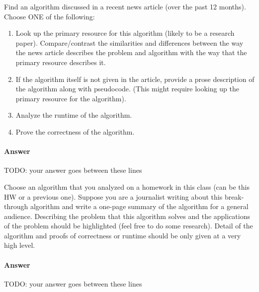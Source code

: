 \documentclass{article}
\begin{document}

\nextprob
{}

Find an algorithm discussed in a recent news article (over the past 12 months).
Choose ONE of the following:
\begin{enumerate}
    \item Look up the primary resource for this algorithm (likely to be a research paper).
    Compare/contrast the similarities and differences between the way the news article describes the problem and algorithm with the way that the primary resource describes it.
    \item If the algorithm itself is not given in the article, provide a prose description of the algorithm along with pseudocode.
    (This might require looking up the primary resource for the algorithm).
    \item Analyze the runtime of the algorithm.
    \item Prove the correctness of the algorithm.
\end{enumerate}

\paragraph{Answer}


TODO: your answer goes between these lines



\nextprob
{}

Choose an algorithm that you analyzed on a homework in this class (can be this HW or a previous one).
Suppose you are a journalist writing about this break-through algorithm and write a one-page summary of the algorithm for a general audience.
Describing the problem that this algorithm solves and the applications of the problem should be highlighted (feel free to do some research).
Detail of the algorithm and proofs of correctness or runtime should be only given at a very high level.

\paragraph{Answer}


TODO: your answer goes between these lines

\end{document}
